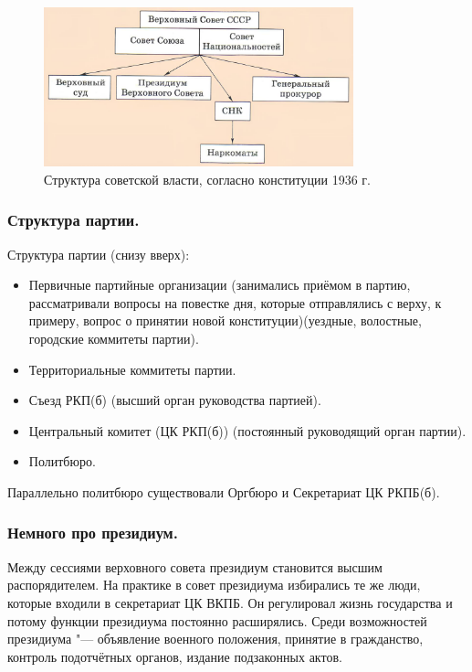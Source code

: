 \begin{figure}[H]
    \centering
    \includegraphics[width=0.8\textwidth]{картинки/Структура_советской_власти_1936.jpg}
    \caption{Структура советской власти, согласно конституции 1936 г.}
\end{figure}

\subsubsection{\textbf{Структура партии.}}

Структура партии (снизу вверх):

\begin{itemize}
    \item Первичные партийные организации (занимались приёмом в партию, рассматривали вопросы на повестке дня, которые отправлялись с верху, к примеру, вопрос о принятии новой конституции)(уездные, волостные, городские коммитеты партии).
    \item Территориальные коммитеты партии.
    \item Съезд РКП(б) (высший орган руководства партией). 
    \item Центральный комитет (ЦК РКП(б)) (постоянный руководящий орган партии).
    \item Политбюро.
\end{itemize}

Параллельно политбюро существовали Оргбюро и Секретариат ЦК РКПБ(б).

\subsubsection{\textbf{Немного про президиум.}}

Между сессиями верховного совета президиум становится высшим распорядителем. На практике в совет президиума избирались те же люди, которые входили в секретариат ЦК ВКПБ. Он регулировал жизнь государства и потому функции президиума постоянно расширялись. Среди возможностей президиума "--- объявление военного положения, принятие в гражданство, контроль подотчётных органов, издание подзаконных актов.